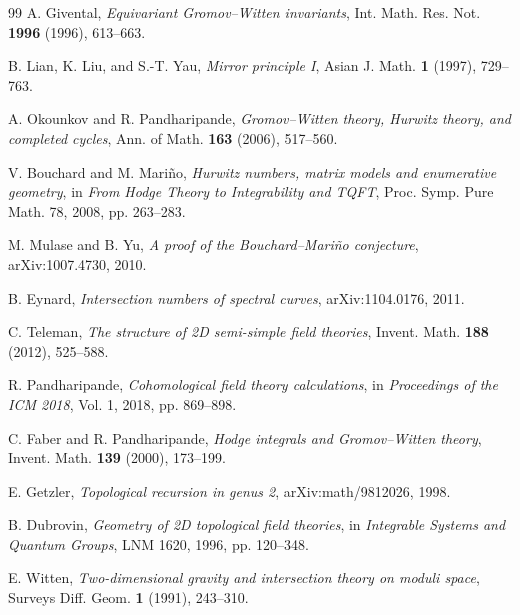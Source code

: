 \documentclass[11pt,a4paper]{article}
\theoremstyle{plain}
\theoremstyle{definition}
\begin{document}
\begin{thebibliography}{99}
 A. Givental,
\textit{Equivariant Gromov--Witten invariants},
Int. Math. Res. Not. \textbf{1996} (1996), 613--663.

 B. Lian, K. Liu, and S.-T. Yau,
\textit{Mirror principle I},
Asian J. Math. \textbf{1} (1997), 729--763.

 A. Okounkov and R. Pandharipande,
\textit{Gromov--Witten theory, Hurwitz theory, and completed cycles},
Ann. of Math. \textbf{163} (2006), 517--560.

 V. Bouchard and M. Mariño,
\textit{Hurwitz numbers, matrix models and enumerative geometry},
in \emph{From Hodge Theory to Integrability and TQFT},
Proc. Symp. Pure Math. 78, 2008, pp. 263--283.

 M. Mulase and B. Yu,
\textit{A proof of the Bouchard--Mariño conjecture},
arXiv:1007.4730, 2010.

 B. Eynard,
\textit{Intersection numbers of spectral curves},
arXiv:1104.0176, 2011.

 C. Teleman,
\textit{The structure of 2D semi-simple field theories},
Invent. Math. \textbf{188} (2012), 525--588.

 R. Pandharipande,
\textit{Cohomological field theory calculations},
in \emph{Proceedings of the ICM 2018}, Vol. 1, 2018, pp. 869--898.

 C. Faber and R. Pandharipande,
\textit{Hodge integrals and Gromov--Witten theory},
Invent. Math. \textbf{139} (2000), 173--199.

 E. Getzler,
\textit{Topological recursion in genus 2},
arXiv:math/9812026, 1998.

 B. Dubrovin,
\textit{Geometry of 2D topological field theories},
in \emph{Integrable Systems and Quantum Groups}, LNM 1620, 1996, pp. 120--348.

 E. Witten,
\textit{Two-dimensional gravity and intersection theory on moduli space},
Surveys Diff. Geom. \textbf{1} (1991), 243--310.

\end{thebibliography}
\end{document}
